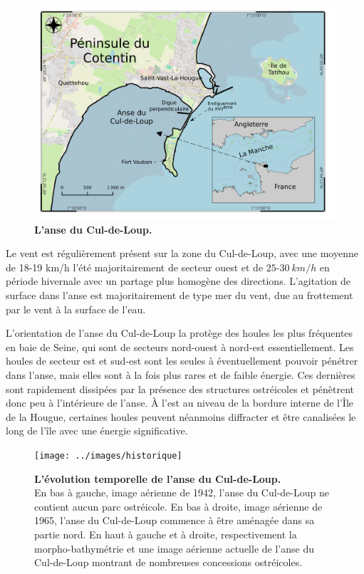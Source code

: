 \documentclass[10pt,a4paper,titlepage]{article}
\begin{document}
    \begin{figure}[!h]
        \centering
        \includegraphics[width=0.8\linewidth]{../images/carte-ADCL}
        \caption[anse du Cul-de-Loup.]{\textbf{L'anse du Cul-de-Loup.}}
        \label{fig:carte-adcl}
    \end{figure}

    Le vent est régulièrement présent sur la zone du Cul-de-Loup, avec une moyenne de 18-19 km/h l'été majoritairement de secteur ouest et de $25$-$30~km/h$ en période hivernale avec un partage plus homogène des directions. L'agitation de surface dans l'anse est majoritairement de type mer du vent, due au frottement par le vent à la surface de l'eau.

    L'orientation de l'anse du Cul-de-Loup la protège des houles les plus fréquentes en baie de Seine, qui sont de secteurs nord-ouest à nord-est essentiellement. Les houles de secteur est et sud-est sont les seules à éventuellement pouvoir pénétrer dans l'anse, mais elles sont à la fois plus rares et de faible énergie. Ces dernières sont rapidement dissipées par la présence des structures ostréicoles et pénètrent donc peu à l'intérieure de l'anse. À l'est au niveau de la bordure interne de l'Île de la Hougue, certaines houles peuvent néanmoins diffracter et être canalisées le long de l'île avec une énergie significative.

    \begin{figure}[h!]
        \centering
        \texttt{[image: ../images/historique]}
        \caption[Évolution de l'anse du Cul-de-Loup]{
            \textbf{L'évolution temporelle de l'anse du Cul-de-Loup.}\\
            En bas à gauche, image aérienne de 1942, l'anse du Cul-de-Loup ne contient aucun parc ostréicole.
            En bas à droite, image aérienne de 1965, l'anse du Cul-de-Loup commence à être aménagée dans sa partie nord.
            En haut à gauche et à droite, respectivement la morpho-bathymétrie  et une image aérienne actuelle de l'anse du Cul-de-Loup montrant de nombreuses concessions ostréicoles. \parencite{geoportail}}
        \label{fig:historique-adcl}
    \end{figure}
\end{document}
